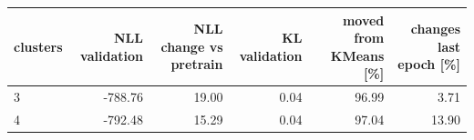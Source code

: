 \begin{tabular}{lrrrrr}
\hline
clusters & NLL validation & NLL change vs pretrain & KL validation & moved from KMeans [\%] & changes last epoch [\%] \\
\hline
3 & -788.76 & 19.00 & 0.04 & 96.99 & 3.71 \\
4 & -792.48 & 15.29 & 0.04 & 97.04 & 13.90 \\
\hline
\end{tabular}
